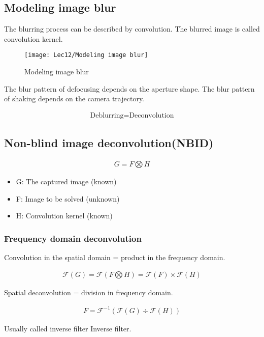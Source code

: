 \subsection{Modeling image blur}
The blurring process can be described by convolution. The blurred image is called convolution kernel. 

\begin{figure}[H]
    \centering
    \texttt{[image: Lec12/Modeling image blur]}
    \caption{Modeling image blur}
\end{figure}

The blur pattern of defocusing depends on the aperture shape. 
The blur pattern of shaking depends on the camera trajectory. 

\begin{align*}
    \text{Deblurring} = \text{Deconvolution}
\end{align*}

\subsection{Non-blind image deconvolution(NBID)}
\begin{align*}
    G=F\bigotimes H
\end{align*}
\begin{itemize}
    \item G: The captured image (known)
    \item F: Image to be solved (unknown)
    \item H: Convolution kernel (known)
\end{itemize}

\subsubsection{Frequency domain deconvolution}
Convolution in the spatial domain = product in the frequency domain. 

\begin{align*}
    \mathcal{F} (G)=\mathcal{F}(F\bigotimes H)=\mathcal{F}(F)\times \mathcal{F}(H)
\end{align*}

Spatial deconvolution = division in frequency domain. 

\begin{align*}
    F=\mathcal{F}^{-1}\left( \mathcal{F}(G) \div \mathcal{F}(H) \right)
\end{align*}

Usually called inverse filter Inverse filter. 

